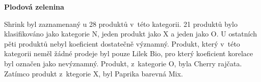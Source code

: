 

\textbf{Plodová zelenina}

Shrink byl zaznamenaný u 28 produktů v~této kategorii. 21 produktů bylo klasifikováno jako kategorie N, jeden produkt jako X a jeden jako O. U ostatních pěti produktů nebyl koeficient dostatečně významný. Produkt, který v~této kategorii neměl žádné prodeje byl pouze Lilek Bio, pro který koeficient korelace byl označen jako nevýznamný. Produkt, z~kategorie O, byla Cherry rajčata. Zatímco produkt z~ktegorie X, byl Paprika barevná Mix.


